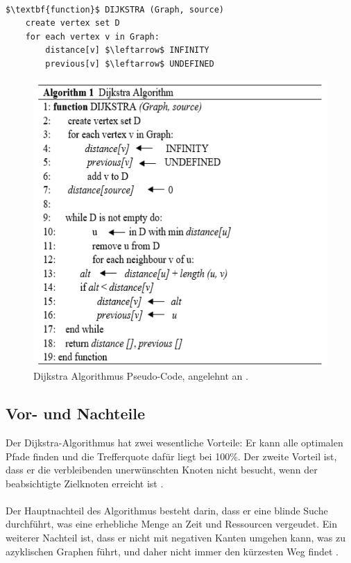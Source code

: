 \noindent \\
\begin{minipage}{1.0\textwidth} \small
\begin{lstlisting}
$\textbf{function}$ DIJKSTRA (Graph, source)
	create vertex set D
	for each vertex v in Graph:
		distance[v] $\leftarrow$ INFINITY
		previous[v] $\leftarrow$ UNDEFINED
\end{lstlisting}
\end{minipage}

\begin{figure}[H]
	\centering
	\includegraphics[width=1.0\textwidth]{images/Dijkstra_pseudoCode.PNG}
	\caption{Dijkstra Algorithmus Pseudo-Code, angelehnt an \cite{Abusalim2020}.}
	\label{fig:Dijkstra Pseudo-Code}
\end{figure}

\subsection{Vor- und Nachteile}
Der Dijkstra-Algorithmus hat zwei wesentliche Vorteile: Er kann alle optimalen Pfade finden und die Trefferquote dafür liegt
bei 100\%. Der zweite Vorteil ist, dass er die verbleibenden unerwünschten Knoten nicht besucht, wenn der beabsichtigte Zielknoten erreicht
ist \cite{Zhou:19,Abusalim2020}.
\\ \\
Der Hauptnachteil des Algorithmus besteht darin, dass er eine blinde Suche durchführt, was eine erhebliche Menge an Zeit und Ressourcen vergeudet. 
Ein weiterer Nachteil ist, dass er nicht mit negativen Kanten umgehen kann, was zu azyklischen Graphen führt, und daher nicht immer den kürzesten 
Weg findet \cite{Mukhlif:20}.


